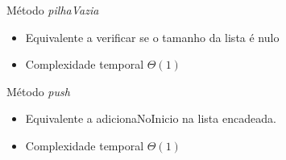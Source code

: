 \documentclass[12pt,table,xcolor={dvipsnames}]{beamer}
\begin{document}
\begin{frame}[fragile]{Método \textit{pilhaVazia}}
	\begin{itemize}
		\item Equivalente a verificar se o tamanho da lista é nulo
		\item Complexidade temporal $\Theta(1)$
	\end{itemize}      
\end{frame}

\begin{frame}[fragile]{Método \textit{push}}
	\begin{itemize}
		\item Equivalente a adicionaNoInicio na lista encadeada.
		\item Complexidade temporal $\Theta(1)$
	\end{itemize}	
\end{frame}	
\end{document}
